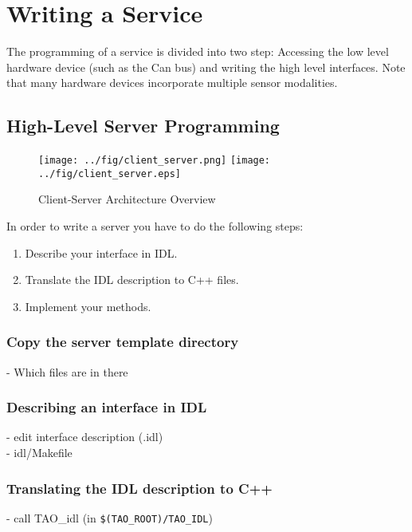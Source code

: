 \chapter{Writing a \miro Service}

The programming of a \miro service is divided into two step:
Accessing the low level hardware device (such as the Can bus) and
writing the high level interfaces. Note that many hardware devices
incorporate multiple sensor modalities.


\section{High-Level Server Programming}

\begin{figure}[!ht]
  \ifpdf
  \texttt{[image: ../fig/client\_server.png]}
  \else
  \texttt{[image: ../fig/client\_server.eps]}
  \fi
  \caption{Client-Server Architecture Overview}
  \label{FIG_CLIENT_SERVER_ARCHITECTURE}
\end{figure}

In order to write a server you have to do the following steps:
\begin{enumerate}
  \item Describe your interface in IDL.
  \item Translate the IDL description to C++ files.
  \item Implement your methods.
\end{enumerate}


\subsection{Copy the \miro server template directory}

- Which files are in there


\subsection{Describing an interface in IDL}

- edit interface description (.idl) \\
- idl/Makefile 

\subsection{Translating the IDL description to C++}

- call TAO\_idl (in {\tt \$(TAO\_ROOT)/TAO\_IDL})


